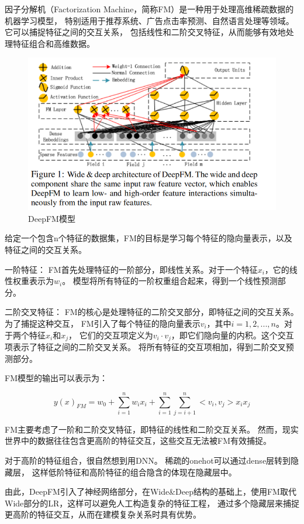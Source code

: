 \documentclass{article}
\begin{document}
因子分解机（Factorization Machine，简称FM）是一种用于处理高维稀疏数据的机器学习模型，
特别适用于推荐系统、广告点击率预测、自然语言处理等领域。它可以捕捉特征之间的交互关系，
包括线性和二阶交叉特征，从而能够有效地处理特征组合和高维数据。
\begin{figure}[htbp]
  \centering
  \includegraphics[scale=0.5]{DeepFM.png}
  \caption{DeepFM模型}
  \label{figure4}
\end{figure}

给定一个包含n个特征的数据集，FM的目标是学习每个特征的隐向量表示，以及特征之间的交互关系。

一阶特征： FM首先处理特征的一阶部分，即线性关系。对于一个特征$x_i$，它的线性权重表示为$w_i$。
模型将所有特征的一阶权重组合起来，得到一个线性预测部分。

二阶交叉特征： FM的核心是处理特征的二阶交叉部分，即特征之间的交互关系。为了捕捉这种交互，
FM引入了每个特征的隐向量表示$v_i$，其中$i=1,2,...,n$。对于两个特征$x_i$和$x_j$，
它们的交互项定义为$v_i \cdot v_j$，即它们隐向量的内积。这个交互项表示了特征之间的二阶交叉关系。
将所有特征的交互项相加，得到二阶交叉预测部分。

FM模型的输出可以表示为：

$$
y(x)_{FM} = w_0 + \sum_{i=1}^nw_ix_i + \sum_{i=1}^n\sum_{j=i+1}^n<v_i,v_j>x_ix_j
$$

FM主要考虑了一阶和二阶交叉特征，即特征的线性和二阶交互关系。
然而，现实世界中的数据往往包含更高阶的特征交互，这些交互无法被FM有效捕捉。

对于高阶的特征组合，很自然想到用DNN。
稀疏的onehot可以通过dense层转到隐藏层，
这样低阶特征和高阶特征的组合隐含的体现在隐藏层中。

由此，DeepFM引入了神经网络部分，在Wide\&Deep结构的基础上，使用FM取代Wide部分的LR，这样可以避免人工构造复杂的特征工程，
通过多个隐藏层来捕捉更高阶的特征交互，从而在建模复杂关系时具有优势。
\end{document}
